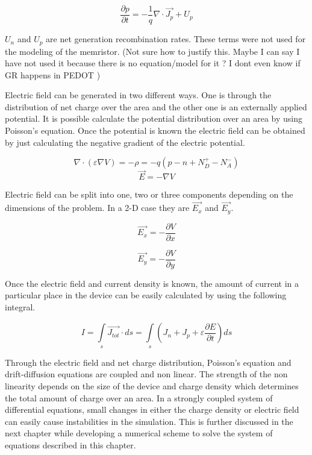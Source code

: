 \begin{equation}
\frac{\partial p}{\partial t}=-\frac{1}{q}\nabla \cdot \vec{J_p}+U_{p}
\label{conp}
\end{equation}

$U_{n}$ and $U_{p}$ are net generation recombination rates. These terms were not used for the modeling of the memristor. (Not sure how to justify this. Maybe I can say I have not used it because there is no equation/model for it ? I dont even know if GR happens in PEDOT )

Electric field can be generated in two different ways. One is through the distribution of net charge over the area and the other one is an externally applied potential. It is possible calculate the potential distribution over an area by using Poisson's equation. Once the potential is known the electric field can be obtained by just calculating the negative gradient of the electric potential.

\begin{equation}
\nabla \cdot  (\varepsilon \nabla V)=-\rho=-q(p-n+N_{D}^{+}-N_{A}^{-})
\label{poisson}
\end{equation}
\begin{equation}
\vec{E}=-\nabla V
\label{Efield}
\end{equation}

Electric field can be split into one, two or three components depending on the dimensions of the problem. In a 2-D case they are $\vec{E_x}$ and $\vec{E_y}$.

\begin{equation}
\vec{E_x}=-\frac{\partial V}{\partial x}
\end{equation}

\begin{equation}
\vec{E_y}=-\frac{\partial V}{\partial y}
\end{equation}

Once the electric field and current density is known, the amount of current in a particular place in the device can be easily calculated by using the following integral.

\begin{equation}
I=\int\limits_{s}^{}\vec{J_{tot}} \cdot ds = \int\limits_{s}^{}(J_n+J_p+\varepsilon\frac{\partial E}{\partial t})ds
\end{equation}


Through the electric field and net charge distribution, Poisson's equation and drift-diffusion equations are coupled and non linear. The strength of the non linearity depends on the size of the device and charge density which determines the total amount of charge over an area. In a strongly coupled system of differential equations, small changes in either the charge density or electric field can easily cause instabilities in the simulation. This is further discussed in the next chapter while developing a numerical scheme to solve the system of equations described in this chapter. 


